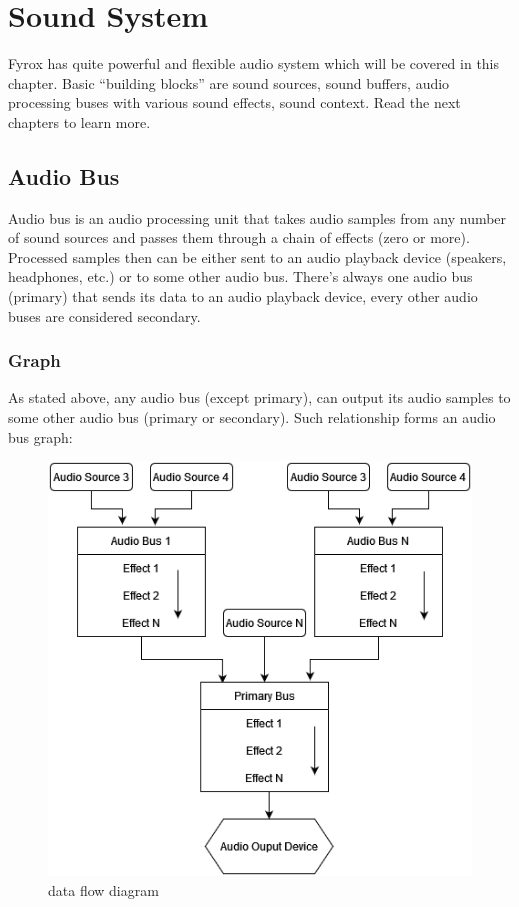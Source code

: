 \documentclass[
]{book}
\theoremstyle{definition}
\theoremstyle{definition}
\theoremstyle{definition}
\theoremstyle{definition}
\theoremstyle{remark}
\begin{document}
\chapter{Sound System}\label{sound-system}

Fyrox has quite powerful and flexible audio system which will be covered in this chapter. Basic ``building blocks'' are sound sources, sound buffers, audio processing buses with various sound effects, sound context. Read the next chapters to learn more.

\section{Audio Bus}\label{audio-bus}

Audio bus is an audio processing unit that takes audio samples from any number of sound sources and passes them through a chain of effects (zero or more). Processed samples then can be either sent to an audio playback device (speakers, headphones, etc.) or to some other audio bus. There's always one audio bus (primary) that sends its data to an audio playback device, every other audio buses are considered secondary.

\subsection{Graph}\label{graph-1}

As stated above, any audio bus (except primary), can output its audio samples to some other audio bus (primary or secondary). Such relationship forms an audio bus graph:

\begin{figure}
\centering
\includegraphics{images/sound_data_flow_diagram.png}
\caption{data flow diagram}
\end{figure}
\end{document}
